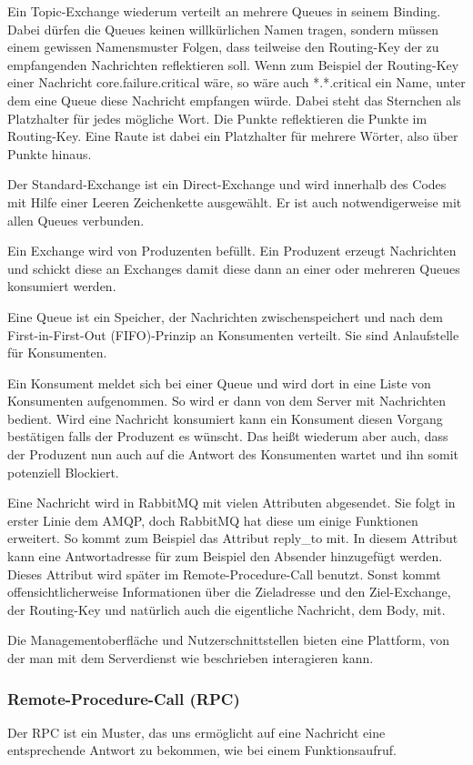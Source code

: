 \documentclass[12pt,a4paper]{scrartcl}
\begin{document}
Ein Topic-Exchange wiederum verteilt an mehrere Queues in seinem Binding. Dabei dürfen die Queues keinen willkürlichen Namen tragen, sondern müssen einem gewissen Namensmuster Folgen, dass teilweise den Routing-Key der zu empfangenden Nachrichten reflektieren soll. Wenn zum Beispiel der Routing-Key einer Nachricht core.failure.critical wäre, so wäre auch *.*.critical ein Name, unter dem eine Queue diese Nachricht empfangen würde. Dabei steht das Sternchen als Platzhalter für jedes mögliche Wort. Die Punkte reflektieren die Punkte im Routing-Key. Eine Raute ist dabei ein Platzhalter für mehrere Wörter, also über Punkte hinaus. 

Der Standard-Exchange ist ein Direct-Exchange und wird innerhalb des Codes mit Hilfe einer Leeren Zeichenkette ausgewählt. Er ist auch notwendigerweise mit allen Queues verbunden.

Ein Exchange wird von Produzenten befüllt. Ein Produzent erzeugt Nachrichten und schickt diese an Exchanges damit diese dann an einer oder mehreren Queues konsumiert werden.

Eine Queue ist ein Speicher, der Nachrichten zwischenspeichert und nach dem First-in-First-Out (FIFO)-Prinzip an Konsumenten verteilt. Sie sind Anlaufstelle für Konsumenten. 

Ein Konsument meldet sich bei einer Queue und wird dort in eine Liste von Konsumenten aufgenommen. So wird er dann von dem Server mit Nachrichten bedient. Wird eine Nachricht konsumiert kann ein Konsument diesen Vorgang bestätigen falls der Produzent es wünscht. Das heißt wiederum aber auch, dass der Produzent nun auch auf die Antwort des Konsumenten wartet und ihn somit potenziell Blockiert.

Eine Nachricht wird in RabbitMQ mit vielen Attributen abgesendet. Sie folgt in erster Linie dem AMQP, doch RabbitMQ hat diese um einige Funktionen erweitert. So kommt zum Beispiel das Attribut reply\_to mit. In diesem Attribut kann eine Antwortadresse für zum Beispiel den Absender hinzugefügt werden. Dieses Attribut wird später im Remote-Procedure-Call benutzt. Sonst kommt offensichtlicherweise Informationen über die Zieladresse und den Ziel-Exchange, der Routing-Key und natürlich auch die eigentliche Nachricht, dem Body, mit.

Die Managementoberfläche und Nutzerschnittstellen bieten eine Plattform, von der man mit dem Serverdienst wie beschrieben interagieren kann.

\subsubsection{Remote-Procedure-Call (RPC)}
Der RPC ist ein Muster, das uns ermöglicht auf eine Nachricht eine entsprechende Antwort zu bekommen, wie bei einem Funktionsaufruf. 
\end{document}
